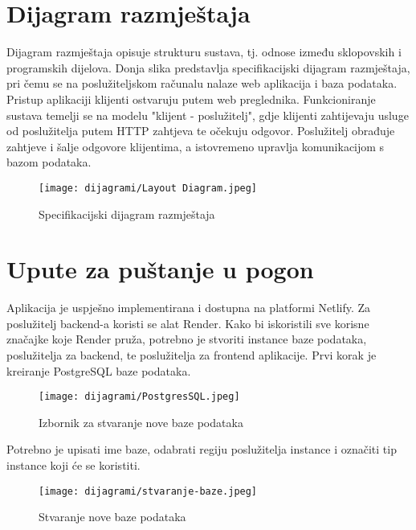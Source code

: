 			\eject 
		
		
		\section{Dijagram razmještaja}
			
			Dijagram razmještaja opisuje strukturu sustava, tj. odnose između sklopovskih i programskih dijelova. Donja slika predstavlja specifikacijski dijagram razmještaja, pri čemu se na poslužiteljskom računalu nalaze web aplikacija i baza podataka. Pristup aplikaciji klijenti ostvaruju putem web preglednika. Funkcioniranje sustava temelji se na modelu "klijent - poslužitelj", gdje klijenti zahtijevaju usluge od poslužitelja putem HTTP zahtjeva te očekuju odgovor. Poslužitelj obrađuje zahtjeve i šalje odgovore klijentima, a istovremeno upravlja komunikacijom s bazom podataka.

            \begin{figure}[H]
			         \texttt{[image: dijagrami/Layout Diagram.jpeg]}
			         \centering
			         \caption{Specifikacijski dijagram razmještaja}
			         \label{fig:LayoutDiagram}
		    \end{figure}
			
			\eject 
		
		\section{Upute za puštanje u pogon}
		
			Aplikacija je uspješno implementirana i dostupna na platformi Netlify. Za poslužitelj backend-a koristi se alat Render. Kako bi iskoristili sve korisne značajke koje Render pruža, potrebno je stvoriti instance baze podataka, poslužitelja za backend, te poslužitelja za frontend aplikacije. Prvi korak je kreiranje PostgreSQL baze podataka.
			
			\begin{figure}[H]
				\texttt{[image: dijagrami/PostgresSQL.jpeg]}
				\centering
				\caption{Izbornik za stvaranje nove baze podataka}
				\label{fig:PostgresSQL}
			\end{figure}
			
			\eject 
			
			Potrebno je upisati ime baze, odabrati regiju poslužitelja instance i označiti tip instance koji će se koristiti.
			
			\begin{figure}[H]
				\texttt{[image: dijagrami/stvaranje-baze.jpeg]}
				\centering
				\caption{Stvaranje nove baze podataka}
				\label{fig:stvaranje-baze}
			\end{figure}
			
